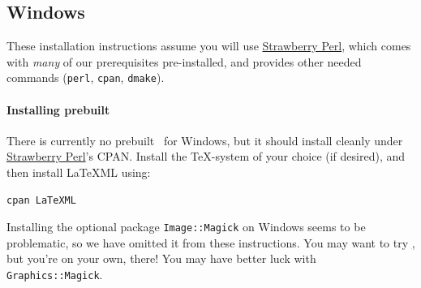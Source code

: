 \documentclass{article}
\begin{document}

\subsection{Windows}
These installation instructions assume you will use
\href{http://strawberryperl.com}{Strawberry Perl},
which comes with \emph{many} of our prerequisites pre-installed,
and provides other needed commands (\texttt{perl}, \texttt{cpan}, \texttt{dmake}).

\paragraph{Installing prebuilt}\label{install.windows}
There is currently no prebuilt \LaTeXML\ for Windows,
but it should install cleanly under \href{http://strawberryperl.com}{Strawberry Perl}'s CPAN.
Install the \TeX-system of your choice (if desired), and then install LaTeXML using:
\begin{lstlisting}[style=shell]
cpan LaTeXML
\end{lstlisting}

Installing the optional package \texttt{Image::Magick} on Windows seems to be problematic,
so we have omitted it from these instructions.
You may want to try \href{ImageMagick}, but
you're on your own, there!  You may  have better luck with \texttt{Graphics::Magick}.
\end{document}
